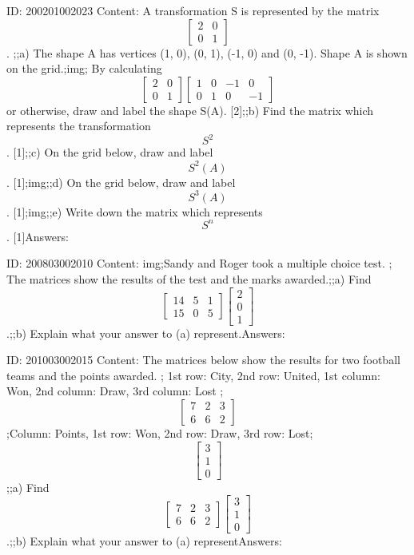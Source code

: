 \documentclass{article}
\begin{document}
ID: 200201002023
Content:
A transformation S is represented by the matrix  $$\begin{bmatrix}2&0\\0&1\end{bmatrix}$$. ;;a) The shape A has vertices (1, 0), (0, 1), (-1, 0) and (0, -1). Shape A is shown on the grid.;img; By calculating $$\begin{bmatrix}2&0\\0&1\end{bmatrix}\begin{bmatrix}1&0&-1&0\\0&1&0&-1\end{bmatrix}$$ or otherwise, draw and label the shape S(A). [2];;b) Find the matrix which represents the transformation $$S^{2} $$. [1];;c) On the grid below, draw and label $$S^{2} (A)$$. [1];img;;d) On the grid below, draw and label $$S^{3} (A)$$. [1];img;;e) Write down the matrix which represents $$S^{n}$$. [1]Answers:

ID: 200803002010
Content:
img;Sandy and Roger took a multiple choice test. ; The matrices show the results of the test and the marks awarded.;;a) Find $$\begin{bmatrix}14&5&1\\15&0&5\end{bmatrix} \begin{bmatrix}2\\0\\1\end{bmatrix}$$.;;b) Explain what your answer to (a) represent.Answers:

ID: 201003002015
Content:
The matrices below show the results for two football teams and the points awarded. ; 1st row: City, 2nd row: United, 1st column: Won, 2nd column: Draw, 3rd column: Lost ; $$\begin{bmatrix}7&2&3\\6&6&2\end{bmatrix}$$ ;Column: Points, 1st row: Won, 2nd row: Draw, 3rd row: Lost; $$\begin{bmatrix}3\\1\\0\end{bmatrix}$$;;a) Find $$\begin{bmatrix}7&2&3\\6&6&2\end{bmatrix} \begin{bmatrix}3\\1\\0\end{bmatrix}$$.;;b) Explain what your answer to (a) representAnswers:
\end{document}

